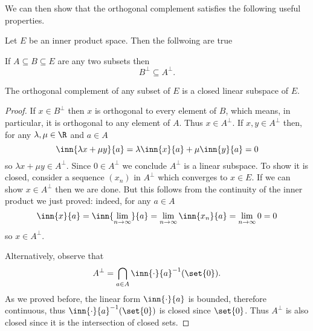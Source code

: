\documentclass[12pt,oneside]{book}
\begin{document}
We can then show that the orthogonal complement satisfies the following useful
properties.
{\def\currentprefix{prop:properties of perp}
\begin{proposition}
	Let \( E \) be an inner product space. Then the follwoing are true
	\begin{points}
	\item {} If \( A \subseteq B \subseteq E \) are any two subsets then
		\begin{equation*}
			B^\perp \subseteq A^\perp.
		\end{equation*}

	\item {} The orthogonal complement of any subset of \( E \) is a closed
		linear subspace of \( E \).
	\end{points}
\end{proposition}
\begin{proof}
	 If \( x \in B^\perp \) then \( x \) is orthogonal to every element of \( B
	\), which means, in particular, it is orthogonal to any element of \( A \). Thus \( x
	\in A^\perp \). 
	 If \( x, y \in A^\perp \) then, for any \( \lambda, \mu \in \R \) and \( a
	\in A \)
	\begin{equation*}
		\inn{\lambda x + \mu y}{a} = \lambda \inn{x}{a} + \mu \inn{y}{a} = 0
	\end{equation*}
	so \( \lambda x + \mu y \in A^\perp \). Since \( 0 \in A^\perp \) we conclude \( A^\perp
	\) is a linear subspace. To show it is closed, consider a sequence \( (x_n) \) in \(
	A^\perp \) which converges to \( x \in E \). If we can show \( x \in A^\perp \) then we
	are done. But this follows from the continuity of the inner product we just proved: indeed, for any \(
	a \in A \)
	\begin{equation*}
		\inn{x}{a} = \inn{\lim_{n \to \infty}}{a} = \lim_{n \to \infty} \inn{x_n}{a} = \lim_{n
		\to \infty} 0 = 0 
	\end{equation*}
	so \( x \in A^\perp \).

	Alternatively, observe that 
	\begin{equation*}
		A^\perp = \bigcap_{a \in A} \inn{\cdot}{a}^{-1}(\set{0}).
	\end{equation*}
	As we proved before, the linear form \( \inn{\cdot}{a} \) is bounded, therefore continuous,
	thus \( \inn{\cdot}{a}^{-1}(\set{0}) \) is closed since \( \set{0} \). Thus \( A^\perp
	\) is also closed since it is the intersection of closed sets.
\end{proof}
}
\end{document}

